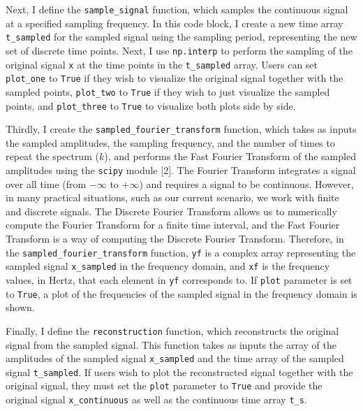 \documentclass{article}
\begin{document}
Next, I define the \verb|sample_signal| function, which samples the continuous signal at a specified sampling frequency.
In this code block, I create a new time array \verb|t_sampled| for the sampled signal using the sampling period, representing the new set of discrete time points. 
Next, I use \verb|np.interp| to perform the sampling of the original signal \verb|x| at the time points in the \verb|t_sampled| array.
Users can set \verb|plot_one| to \verb|True| if they wish to visualize the original signal together with the sampled points, \verb|plot_two| to \verb|True| if they wish to just visualize the sampled points, and \verb|plot_three| to \verb|True| to visualize both plots side by side.

Thirdly, I create the \verb|sampled_fourier_transform| function, which takes as inputs the sampled amplitudes, the sampling frequency, and the number of times to repeat the spectrum ($k$), 
and performs the Fast Fourier Transform of the sampled amplitudes using the \verb|scipy| module [2].
The Fourier Transform integrates a signal over all time (from $-\infty$ to $+\infty$) and requires a signal to be continuous. 
However, in many practical situations, such as our current scenario, we work with finite and discrete signals. 
The Discrete Fourier Transform allows us to numerically compute the Fourier Transform for a finite time interval, 
and the Fast Fourier Transform is a way of computing the Discrete Fourier Transform. 
Therefore, in the \verb|sampled_fourier_transform| function, \verb|yf| is a complex array representing the sampled signal \verb|x_sampled| in the frequency domain, 
and \verb|xf| is the frequency values, in Hertz, that each element in \verb|yf| corresponds to.
If \verb|plot| parameter is set to \verb|True|, a plot of the frequencies of the sampled signal in the frequency domain is shown.

Finally, I define the \verb|reconstruction| function, which reconstructs the original signal from the sampled signal.
This function takes as inputs the array of the amplitudes of the sampled signal \verb|x_sampled| and the time array of the sampled signal \verb|t_sampled|.
If users wish to plot the reconstructed signal together with the original signal, they must set the \verb|plot| parameter to \verb|True| and provide the original signal \verb|x_continuous| as well as the continuous time array \verb|t_s|.
\end{document}
